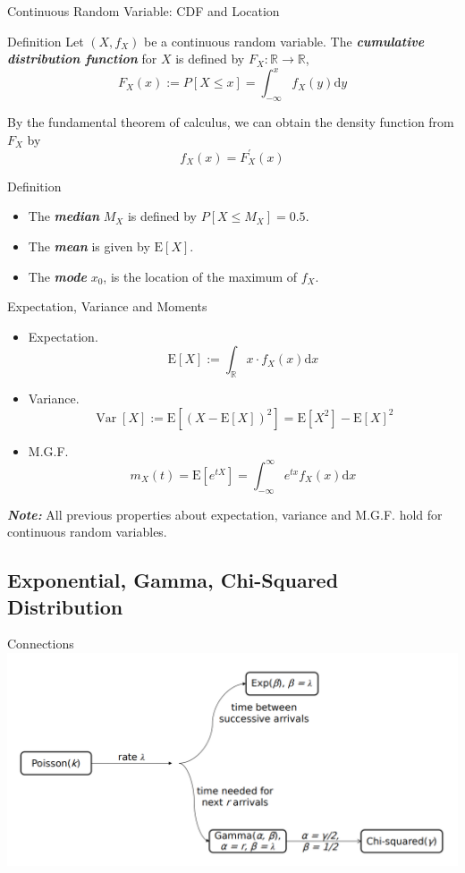 \documentclass{beamer}
\newcommand{\bb}[1]{\textcolor{antiquefuchsia}{\textbf{\textit{#1}}}}
\begin{document}
\begin{frame}{Continuous Random Variable: CDF and Location}
\begin{block}{Definition}
Let $\left(X, f_{X}\right)$ be a continuous random variable. The \bb{cumulative distribution function} for $X$ is defined by $F_{X}: \mathbb{R} \rightarrow \mathbb{R}$,
$$
F_{X}(x):=P[X \leq x]=\int_{-\infty}^{x} f_{X}(y) \mathrm{d} y
$$
\end{block}
By the fundamental theorem of calculus, we can obtain the density function from $F_{X}$ by
$$
f_{X}(x)=F_{X}^{\prime}(x)
$$
\begin{block}{Definition}
\begin{itemize}
\item The \bb{median} $M_{X}$ is defined by $P\left[X \leq M_{X}\right]=0.5$.
\item The \bb{mean} is given by $\mathrm{E}[X]$.
\item The \bb{mode} $x_{0}$, is the location of the maximum of $f_{X}$.
\end{itemize}
\end{block}
\end{frame}

\begin{frame}{Expectation, Variance and Moments}
\begin{itemize}
\item Expectation.
$$
\mathrm{E}[X]:=\int_{\mathbb{R}} x \cdot f_{X}(x) \mathrm{d} x
$$
\item Variance.
$$
\operatorname{Var}[X]:=\mathrm{E}\left[(X-\mathrm{E}[X])^{2}\right]=\mathrm{E}\left[X^{2}\right]-\mathrm{E}[X]^{2}
$$
\item M.G.F.
$$
m_{X}(t)=\mathrm{E}\left[e^{t X}\right]=\int_{-\infty}^{\infty} e^{t x} f_{X}(x) \mathrm{d} x
$$
\end{itemize}
\bb{Note:} All previous properties about expectation, variance and M.G.F. hold
for continuous random variables.
\end{frame}

\subsection{Exponential, Gamma, Chi-Squared Distribution}
\begin{frame}{Connections}
\includegraphics[scale=0.35]{connection.png}
\end{frame}
\end{document}
